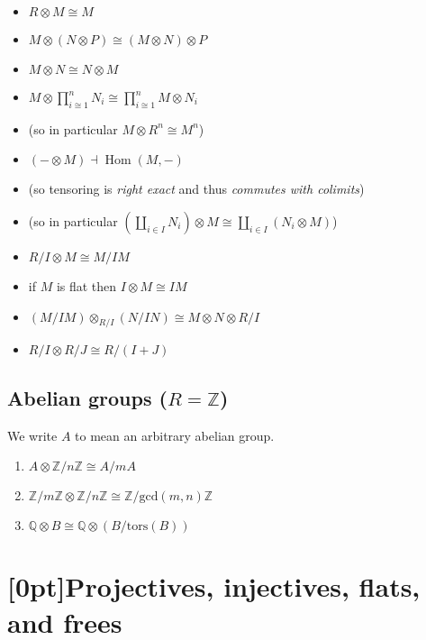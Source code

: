 \documentclass[10pt]{article}
\DeclareMathOperator{\Hom}{Hom}
\newcommand{\HA}{\textcolor{cyan}{HA}}
\begin{document}
            \begin{itemize}
                \item $R\otimes M\cong M$
                \item $M\otimes (N\otimes P) \cong  (M\otimes N)\otimes P$
                \item $M\otimes N \cong  N\otimes M$
                \bigskip
                \item $M\otimes\prod_{i\cong 1}^n N_i \cong  \prod_{i\cong 1}^n M\otimes N_i$
                \item (so in particular $M\otimes R^n \cong  M^n$)
                \bigskip
                \item $(-\otimes M)\dashv\Hom(M,-)$
                \item (so tensoring is \emph{right exact} and thus \emph{commutes with colimits})
                \item (so in particular $\left(\coprod_{i\in I} N_i\right)\otimes M \cong  \coprod_{i\in I} (N_i\otimes M)$)
                \bigskip
                \item $R/I\otimes M \cong  M/IM$
                \item if $M$ is flat then $I\otimes M\cong IM$
                \item $(M/IM)\otimes_{R/I}(N/IN) \cong  M\otimes N\otimes R/I$
                \item $R/I\otimes R/J \cong  R/(I+J)$
            \end{itemize}


        \subsection{Abelian groups ($R=\mathbb{Z}$)}

            We write $A$ to mean an arbitrary abelian group.

            \begin{enumerate}
                \item $A\otimes\mathbb{Z}/n\mathbb{Z}\cong A/mA$
                \item $\mathbb{Z}/m\mathbb{Z}\otimes\mathbb{Z}/n\mathbb{Z}\cong\mathbb{Z}/\mathrm{gcd}(m,n)\mathbb{Z}$
                \item $\mathbb{Q}\otimes B\cong\mathbb{Q}\otimes(B/\mathrm{tors}(B))$
            \end{enumerate}
        
    \section{\protect\marginnote{\HA}[0pt]Projectives, injectives, flats, and frees}
\end{document}
